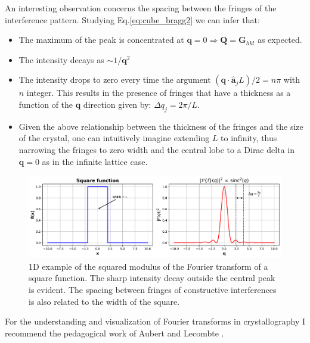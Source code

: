 An interesting observation concerns the spacing between the fringes of the interference pattern. Studying Eq.\ref{eq:cube_bragg2}
we can infer that:  

\begin{itemize}
    \item The maximum of the peak is concentrated at $\mathbf q = 0  \Rightarrow \mathbf Q = \mathbf{G}_{hkl}$ as expected. 
    \item The intensity decays as $ \sim 1/\mathbf{q}^2$
    \item The 
    intensity drops to zero every time the argument $(\mathbf{q} \cdot \mathbf{\hat{a}}_j L) /2 = n\pi$ with $n$ integer. 
    This results in the presence of fringes that have a thickness as a function of the $\mathbf q$ direction given by:
    $\Delta q_j = 2\pi/L$. 
    \item Given the above relationship between the thickness of the fringes and the size of the crystal, one can intuitively
    imagine extending $L$ to infinity, thus narrowing the fringes to zero width and the central lobe to a Dirac delta in $\mathbf{q} = 0$ 
    as in the infinite lattice case. 
\end{itemize}

\begin{figure}[H]
    \centering
    \includegraphics[width=\textwidth]{figures/Intro/square.pdf}
    \caption{1D example of the squared modulus of the Fourier transform of a square function. The sharp intensity decay 
     outside the central peak is evident. The spacing between fringes of constructive interferences is also related 
     to the width of the square.}
    \label{fig:square_ft}
\end{figure}

For the understanding and visualization of Fourier transforms in crystallography I recommend the pedagogical work of 
Aubert and Lecombte \cite{Aubert:kk5014}.

